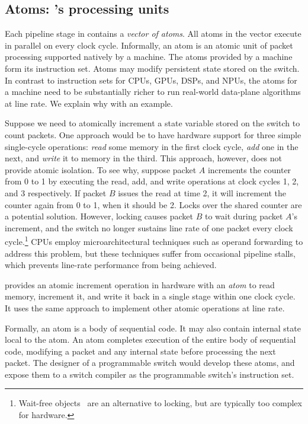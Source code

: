 \subsection{Atoms: \absmachine's processing units}
\label{ss:atoms}

Each pipeline stage in \absmachine contains a {\em vector of
  atoms}. All atoms in the vector execute in parallel on every clock
cycle.  Informally, an atom is an atomic unit of packet processing
supported natively by a \absmachine machine.
The atoms provided by 
a \absmachine machine form its instruction set.
Atoms may modify persistent state stored on the
switch. In contrast to instruction sets for CPUs, GPUs, DSPs, and
NPUs, the atoms for a \absmachine machine need to be substantially
richer to run real-world data-plane algorithms at line rate. We
explain why with an example.

Suppose we need to atomically increment a state variable stored on the switch
to count packets. One approach would be to have hardware support for three
simple single-cycle operations: \textit{read} some memory in the first clock
cycle, \textit{add} one in the next, and \textit{write} it to memory in the
third. This approach, however, does not provide atomic isolation. To see why,
suppose packet $A$ increments the counter from 0 to 1 by executing the read,
add, and write operations at clock cycles 1, 2, and 3 respectively.  If packet
$B$ issues the read at time 2, it will increment the counter again from 0 to 1,
when it should be 2. Locks over the shared counter are a potential
solution. However, locking causes packet $B$ to wait during packet $A$'s
increment, and the switch no longer sustains line rate of one packet every
clock cycle.\footnote{Wait-free objects~\cite{herlihy_wait} are an alternative
  to locking, but are typically too complex for hardware.} CPUs employ microarchitectural
  techniques such as operand forwarding to address this problem, but these techniques
  suffer from occasional pipeline stalls, which prevents line-rate
  performance from being achieved.

\absmachine provides an atomic increment operation in hardware with an {\em
atom} to read memory, increment it, and write it back in a single stage within
one clock cycle. It uses the same approach to implement other atomic operations
at line rate.

Formally, an atom is a body of sequential code. It may also contain internal
state local to the atom. An atom completes execution of the entire body of
sequential code, modifying a packet and any internal state before processing
the next packet. The designer of a programmable switch would develop these
atoms, and expose them to a switch compiler as the programmable switch's
instruction set.

